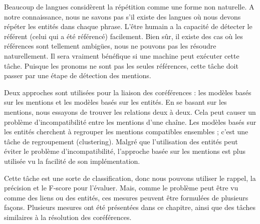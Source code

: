 \documentclass{KodeBook}
\begin{document}
\begin{discussion}
Beaucoup de langues considèrent la répétition comme une forme non naturelle. 
A notre connaissance, nous ne savons pas s'il existe des langues où nous devons répéter les entités dans chaque phrase. 
L'être humain a la capacité de détecter le référent (celui qui a été référencé) facilement. 
Bien sûr, il existe des cas où les références sont tellement ambigües, nous ne pouvons pas les résoudre naturellement. 
Il sera vraiment bénéfique si une machine peut exécuter cette tâche. 
Puisque les pronoms ne sont pas les seules références, cette tâche doit passer par une étape de détection des mentions. 

Deux approches sont utilisées pour la liaison des coréférences : les modèles basés sur les mentions et les modèles basés sur les entités. 
En se basant sur les mentions, nous essayons de trouver les relations deux à deux.
Cela peut causer un problème d'incompatibilité entre les mentions d'une chaîne. 
Les modèles basés sur les entités cherchent à regrouper les mentions compatibles ensembles ; c'est une tâche de regroupement (clustering). 
Malgré que l'utilisation des entités peut éviter le problème d'incompatibilité, l'approche basée sur les mentions est plus utilisée vu la facilité de son implémentation. 

Cette tâche est une sorte de classification, donc nous pouvons utiliser le rappel, la précision et le F-score pour l'évaluer. 
Mais, comme le problème peut être vu comme des liens ou des entités, ces mesures peuvent être formulées de plusieurs façons. 
Plusieurs mesures ont été présentées dans ce chapitre, ainsi que des tâches similaires à la  résolution des coréférences.
\end{discussion}

\ifx\wholebook\relax\else
% 
% 
	
\end{document}
